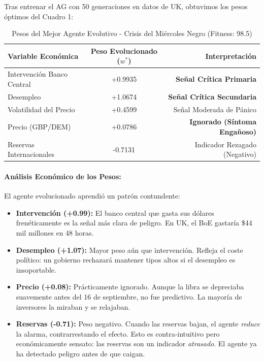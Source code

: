Tras entrenar el AG con 50 generaciones en datos de UK, obtuvimos los pesos óptimos del Cuadro 1:

\begin{table}[H]
\centering
\caption{Pesos del Mejor Agente Evolutivo - Crisis del Miércoles Negro (Fitness: 98.5)}
\begin{tabular}{lcr}
\toprule
Variable Económica & Peso Evolucionado ($w^*$) & Interpretación \\
\midrule
Intervención Banco Central & +0.9935 & \textbf{Señal Crítica Primaria} \\
Desempleo & +1.0674 & \textbf{Señal Crítica Secundaria} \\
Volatilidad del Precio & +0.4599 & Señal Moderada de Pánico \\
Precio (GBP/DEM) & +0.0786 & \textbf{Ignorado (Síntoma Engañoso)} \\
Reservas Internacionales & -0.7131 & Indicador Rezagado (Negativo) \\
\bottomrule
\end{tabular}
\end{table}

\paragraph{Análisis Económico de los Pesos:}
El agente evolucionado aprendió un patrón contundente:
\begin{itemize}
    \item \textbf{Intervención (+0.99):} El banco central que gasta sus dólares frenéticamente es la señal más clara de peligro. En UK, el BoE gastaría \$44 mil millones en 48 horas.
    \item \textbf{Desempleo (+1.07):} Mayor peso aún que intervención. Refleja el coste político: un gobierno rechazará mantener tipos altos si el desempleo es insoportable.
    \item \textbf{Precio (+0.08):} Prácticamente ignorado. Aunque la libra se depreciaba suavemente antes del 16 de septiembre, no fue predictivo. La mayoría de inversores la miraban y se relajaban.
    \item \textbf{Reservas (-0.71):} Peso negativo. Cuando las reservas bajan, el agente \textit{reduce} la alarma, contrarrestando el efecto. Esto es contra-intuitivo pero económicamente sensato: las reservas son un indicador \textit{atrasado}. El agente ya ha detectado peligro antes de que caigan.
\end{itemize}

